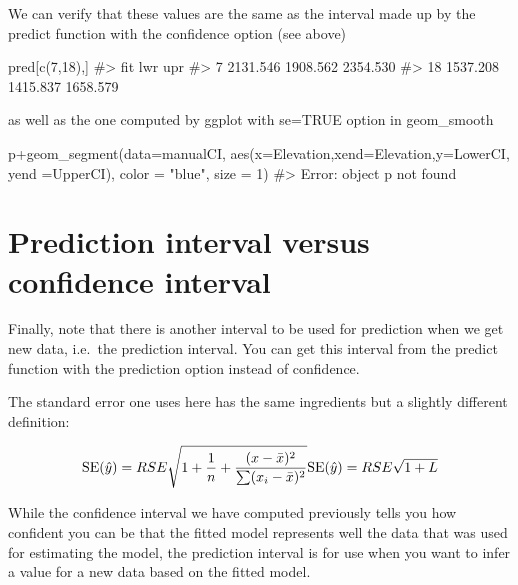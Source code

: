 \documentclass[
  letterpaper,
  DIV=11,
  numbers=noendperiod]{scrreprt}
\newenvironment{Shaded}{\begin{snugshade}}{\end{snugshade}}
\newcommand{\AttributeTok}[1]{\textcolor[rgb]{0.40,0.45,0.13}{#1}}
\newcommand{\CommentTok}[1]{\textcolor[rgb]{0.37,0.37,0.37}{#1}}
\newcommand{\DecValTok}[1]{\textcolor[rgb]{0.68,0.00,0.00}{#1}}
\newcommand{\FunctionTok}[1]{\textcolor[rgb]{0.28,0.35,0.67}{#1}}
\newcommand{\NormalTok}[1]{\textcolor[rgb]{0.00,0.23,0.31}{#1}}
\newcommand{\SpecialCharTok}[1]{\textcolor[rgb]{0.37,0.37,0.37}{#1}}
\newcommand{\StringTok}[1]{\textcolor[rgb]{0.13,0.47,0.30}{#1}}
\begin{document}
We can verify that these values are the same as the interval made up by
the predict function with the confidence option (see above)

\begin{Shaded}
\begin{Highlighting}[]
\NormalTok{pred[}\FunctionTok{c}\NormalTok{(}\DecValTok{7}\NormalTok{,}\DecValTok{18}\NormalTok{),]}
\CommentTok{\#\textgreater{}         fit      lwr      upr}
\CommentTok{\#\textgreater{} 7  2131.546 1908.562 2354.530}
\CommentTok{\#\textgreater{} 18 1537.208 1415.837 1658.579}
\end{Highlighting}
\end{Shaded}

as well as the one computed by ggplot with se=TRUE option in
geom\_smooth

\begin{Shaded}
\begin{Highlighting}[]
\NormalTok{p}\SpecialCharTok{+}\FunctionTok{geom\_segment}\NormalTok{(}\AttributeTok{data=}\NormalTok{manualCI, }\FunctionTok{aes}\NormalTok{(}\AttributeTok{x=}\NormalTok{Elevation,}\AttributeTok{xend=}\NormalTok{Elevation,}\AttributeTok{y=}\NormalTok{LowerCI, }\AttributeTok{yend =}\NormalTok{UpperCI), }\AttributeTok{color =} \StringTok{"blue"}\NormalTok{, }\AttributeTok{size =} \DecValTok{1}\NormalTok{)}
\CommentTok{\#\textgreater{} Error: object \textquotesingle{}p\textquotesingle{} not found}
\end{Highlighting}
\end{Shaded}

\section{Prediction interval versus confidence
interval}\label{prediction-interval-versus-confidence-interval}

Finally, note that there is another interval to be used for prediction
when we get new data, i.e.~the prediction interval. You can get this
interval from the predict function with the prediction option instead of
confidence.

The standard error one uses here has the same ingredients but a slightly
different definition:

\[\text{SE}(\hat{y}) = RSE\sqrt{1+ \frac{1}{n} + \frac{(x - \bar{x})^2}{\sum (x_i - \bar{x})^2}}\\
   \text{SE}(\hat{y}) = RSE\sqrt{1+L}\]

While the confidence interval we have computed previously tells you how
confident you can be that the fitted model represents well the data that
was used for estimating the model, the prediction interval is for use
when you want to infer a value for a new data based on the fitted model.
\end{document}
